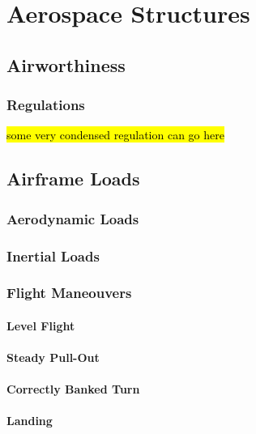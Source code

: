 \chapter{Aerospace Structures}

\newpage
\section{Airworthiness}



\subsection{Regulations}
\hl{some very condensed regulation can go here}





\newpayge
\section{Airframe Loads}
\subsection{Aerodynamic Loads}

\subsection{Inertial Loads}

\subsection{Flight Maneouvers}
\subsubsection{Level Flight}

\subsubsection{Steady Pull-Out}

\subsubsection{Correctly Banked Turn}

\subsubsection{Landing}

